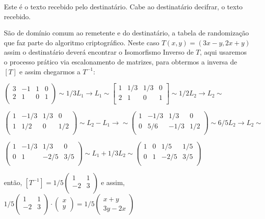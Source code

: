 Este é o texto recebido pelo destinatário. Cabe ao destinatário decifrar, o texto recebido.

São de domínio comum ao remetente e do destinatário, a tabela de
randomização que faz parte do algoritmo criptográfico. Neste caso $T(x, y) = (3x -y, 2x + y)$ assim o destinatário deverá encontrar
o Isomorfismo Inverso de $T$, aqui usaremos o processo prático via escalonamento de matrizes, para obtermos a inversa de $[T]$ e assim chegarmos a $T^{-1}$:

$
	\begin{pmatrix}
		3 & -1 & 1 & 0 \\
		2 & 1  & 0 & 1 \\
	\end{pmatrix}
	\sim 1/3 L_1 \rightarrow L_1 \sim
	\begin{bmatrix}
		1 & 1/3 & 1/3 & 0 \\
		2 & 1   & 0   & 1 \\
	\end{bmatrix}
	\sim 1/2 L_2 \rightarrow L_2 \sim
$

$
	\begin{pmatrix}
		1 & -1/3 & 1/3 & 0   \\
		1 & 1/2  & 0   & 1/2 \\
	\end{pmatrix}
	\sim L_2 - L_1 \rightarrow \sim
	\begin{pmatrix}
		1 & -1/3 & 1/3  & 0   \\
		0 & 5/6  & -1/3 & 1/2 \\
	\end{pmatrix}
	\sim 6/5 L_2 \rightarrow L_2 \sim
$

$
	\begin{pmatrix}
		1 & -1/3 & 1/3  & 0   \\
		0 & 1    & -2/5 & 3/5 \\
	\end{pmatrix}
	\sim L_1 + 1/3 L_2 \sim
	\begin{pmatrix}
		1 & 0 & 1/5  & 1/5 \\
		0 & 1 & -2/5 & 3/5 \\
	\end{pmatrix}
$

\noindent então,
$[T^{-1}] = 1/5
	\begin{pmatrix}
		1  & 1 \\
		-2 & 3 \\
	\end{pmatrix}
$ e assim, $1/5
	\begin{pmatrix}
		1  & 1 \\
		-2 & 3 \\
	\end{pmatrix}
	\cdot
	\begin{pmatrix}
		x \\ y
	\end{pmatrix}
	= 1/5\begin{pmatrix}
		x + y \\
		3y -2x
	\end{pmatrix}
$

